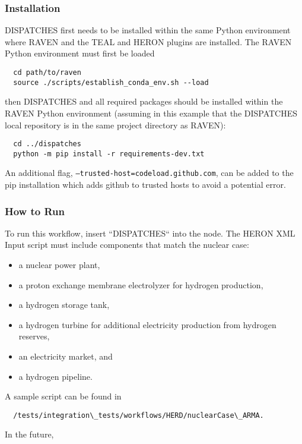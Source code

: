 \subsubsection{Installation}
DISPATCHES first needs to be installed within the same Python environment where RAVEN and the TEAL and HERON plugins are installed. The RAVEN Python environment must first be loaded
\begin{lstlisting}
  cd path/to/raven
  source ./scripts/establish_conda_env.sh --load
\end{lstlisting}
then DISPATCHES and all required packages should be installed within the RAVEN Python environment (assuming in this example that the DISPATCHES local repository is in the same project directory as RAVEN):
\begin{lstlisting}
  cd ../dispatches 
  python -m pip install -r requirements-dev.txt 
\end{lstlisting}
An additional flag, \texttt{--trusted-host=codeload.github.com}, can be added to the pip installation which adds github to trusted hosts to avoid a potential error. 

\subsubsection{How to Run}
To run this workflow, insert “DISPATCHES“ into the  node. The HERON XML Input script must include components that match the nuclear case:
\begin{itemize}
  \item a nuclear power plant,
  \item a proton exchange membrane electrolyzer for hydrogen production,
  \item a hydrogen storage tank,
  \item a hydrogen turbine for additional electricity production from hydrogen reserves,
  \item an electricity market, and
  \item a hydrogen pipeline.
\end{itemize}
A sample script can be found in
\begin{lstlisting}
  /tests/integration\_tests/workflows/HERD/nuclearCase\_ARMA.
\end{lstlisting} 

In the future, 